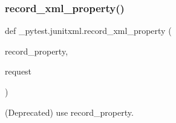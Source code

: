 \subsubsection{\texorpdfstring{record\+\_\+xml\+\_\+property()}{record\_xml\_property()}}
{\footnotesize\ttfamily def \+\_\+pytest.\+junitxml.\+record\+\_\+xml\+\_\+property (\begin{DoxyParamCaption}\item[{}]{record\+\_\+property,  }\item[{}]{request }\end{DoxyParamCaption})}

\begin{DoxyVerb}(Deprecated) use record_property.\end{DoxyVerb}
 